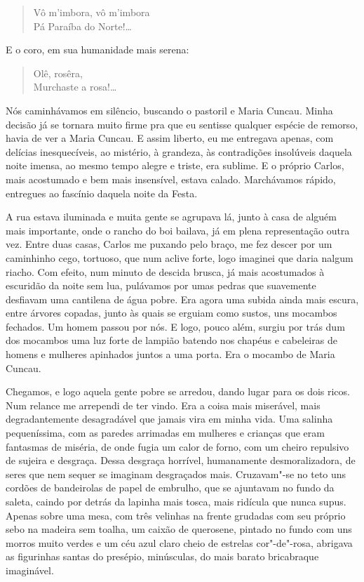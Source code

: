 \begin{verse}
Vô m'imbora, vô m'imbora\\
Pá Paraíba do Norte!\ldots{}
\end{verse}

E o coro, em sua humanidade mais serena:

\begin{verse}
Olê, rosêra,\\
Murchaste a rosa!\ldots{}
\end{verse}

Nós caminhávamos em silêncio, buscando o pastoril e Maria Cuncau. Minha
decisão já se tornara muito firme pra que eu sentisse qualquer espécie
de remorso, havia de ver a Maria Cuncau. E assim liberto, eu me
entregava apenas, com delícias inesquecíveis, ao mistério, à grandeza,
às contradições insolúveis daquela noite imensa, ao mesmo tempo alegre e
triste, era sublime. E o próprio Carlos, mais acostumado e bem mais
insensível, estava calado. Marchávamos rápido, entregues ao fascínio
daquela noite da Festa.

A rua estava iluminada e muita gente se agrupava lá, junto à casa de
alguém mais importante, onde o rancho do boi bailava, já em plena
representação outra vez. Entre duas casas, Carlos me puxando pelo braço,
me fez descer por um caminhinho cego, tortuoso, que num aclive forte,
logo imaginei que daria nalgum riacho. Com efeito, num minuto de descida
brusca, já mais acostumados à escuridão da noite sem lua, pulávamos por
umas pedras que suavemente desfiavam uma cantilena de água pobre. Era
agora uma subida ainda mais escura, entre árvores copadas, junto às
quais se erguiam como sustos, uns mocambos fechados. Um homem passou por
nós. E logo, pouco além, surgiu por trás dum dos mocambos uma luz forte
de lampião batendo nos chapéus e cabeleiras de homens e mulheres
apinhados juntos a uma porta. Era o mocambo de Maria Cuncau.

Chegamos, e logo aquela gente pobre se arredou, dando lugar para os dois
ricos. Num relance me arrependi de ter vindo. Era a coisa mais
miserável, mais degradantemente desagradável que jamais vira em minha
vida. Uma salinha pequeníssima, com as paredes arrimadas em mulheres e
crianças que eram fantasmas de miséria, de onde fugia um calor de forno,
com um cheiro repulsivo de sujeira e desgraça. Dessa desgraça horrível,
humanamente desmoralizadora, de seres que nem sequer se imaginam
desgraçados mais. Cruzavam"-se no teto uns cordões de bandeirolas de
papel de embrulho, que se ajuntavam no fundo da saleta, caindo por
detrás da lapinha mais tosca, mais ridícula que nunca supus. Apenas
sobre uma mesa, com três velinhas na frente grudadas com seu próprio
sebo na madeira sem toalha, um caixão de querosene, pintado no fundo com
uns morros muito verdes e um céu azul claro cheio de estrelas
cor"-de"-rosa, abrigava as figurinhas santas do presépio, minúsculas, do
mais barato bricabraque imaginável.

